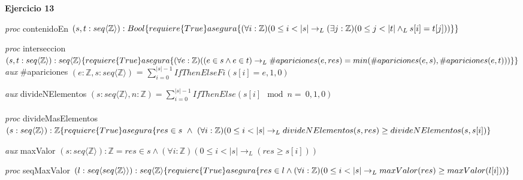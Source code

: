\documentclass{article}
\begin{document}
\LARGE{\textbf{Ejercicio 13}}\\
\begin{itemize}\large{
    \item [a) ] \textit{proc} contenidoEn $(s,t:seq\langle\mathbb{Z}\rangle):Bool\{\\
    requiere\{True\}\\
    asegura\{(\forall i:\mathbb{Z})(0\leq i<|s| \to_L (\exists j:\mathbb{Z})(0\leq j<|t| \land_L s[i]=t[j]))\}\\
    \}$
    
    \item[b) ] \textit{proc} interseccion $(s,t:seq\langle\mathbb{Z}\rangle):seq\langle\mathbb{Z}\rangle\{\\
    requiere\{True\}\\
    asegura\{(\forall e:\mathbb{Z})((e\in s \land e \in t) \to_L \\\#apariciones(e,res)=min(\#apariciones(e,s),\#apariciones(e,t)))\}\\
    \}$\\
    \textit{aux} \#apariciones $(e:\mathbb{Z},s:seq\langle \mathbb{Z} \rangle)$ = $\displaystyle\sum_{i=0}^{|s|-1}IfThenElseFi(s[i]=e,1,0)$\\
    
    \item[c) ] \textit{aux} divideNElementos $(s:seq\langle\mathbb{Z}\rangle,n:\mathbb{Z}) = \displaystyle\sum_{i=0}^{|s|-1} IfThenElse(s[i] \mod n =\ 0,1,0)$\\\\
    \textit{proc} divideMasElementos $(s:seq\langle\mathbb{Z}\rangle):\mathbb{Z}\{\\
    requiere\{True\}\\
    asegura\{res \in s\ \land\ (\forall i:\mathbb{Z})(0\leq i <|s| \to_L divideNElementos(s,res)\geq divideNElementos(s,s[i])\}$\\
    
    
    \item[d) ] \textit{aux} maxValor $(s:seq\langle\mathbb{Z}\rangle):\mathbb{Z}= res \in s \land (\forall i:\mathbb{Z})(0\leq i <|s| \to_L (res\geq s[i]))$
    
    \textit{proc} seqMaxValor $(l:seq\langle seq\langle\mathbb{Z}\rangle\rangle):seq\langle\mathbb{Z}\rangle\{\\
    requiere\{True\}\\
    asegura\{res \in l \land (\forall i:\mathbb{Z})(0\leq i<|s| \to_L maxValor(res)\geq maxValor(l[i]))\}$\\
    
}
\end{itemize}
\end{document}
